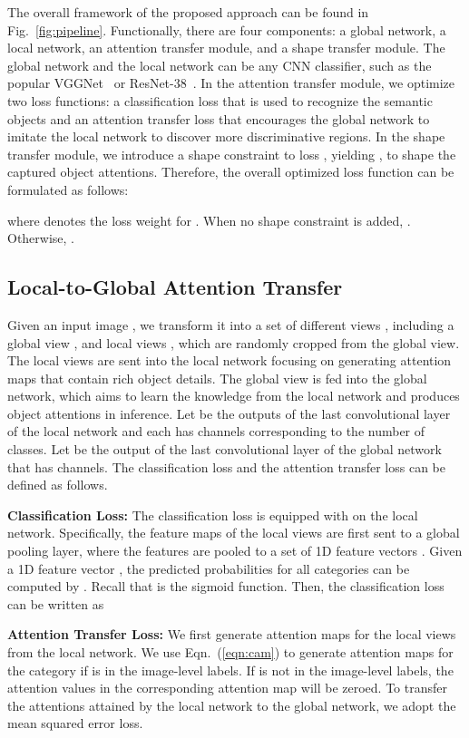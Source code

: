 \documentclass[10pt,twocolumn,letterpaper]{article}
\newcommand{\myPara}[1]{\vspace{.05in}\noindent\textbf{#1:}}
\newcommand{\figref}[1]{Fig.~\ref{#1}}
\newcommand{\eqnref}[1]{Eqn.~(\ref{#1})}
\begin{document}
The overall framework of the proposed approach can be found 
in \figref{fig:pipeline}.
Functionally, there are four components: a global network, a local
network, an attention transfer module, and a shape transfer module.
The global network and the local network can be any CNN classifier,
such as the popular VGGNet~\cite{simonyan2014very} 
or ResNet-38~\cite{wu2019wider}.
In the attention transfer module, we optimize two loss functions:
a classification loss  that is used to recognize the
semantic objects and an attention transfer loss 
that encourages the global network to imitate the local network
to discover more discriminative regions.
In the shape transfer module, we introduce a shape constraint to
loss , yielding ,
to shape the captured object attentions.
Therefore, the overall optimized loss function can be formulated as follows:

where  denotes the loss weight for .
When no shape constraint is added, .
Otherwise, .

\subsection{Local-to-Global Attention Transfer} \label{sec:ATr}


Given an input image , we transform it into a set of different views ,
including a global view , and  local views ,
which are randomly cropped from the global view.
The local views  are sent into the local network 
focusing on generating attention maps that contain rich object details.
The global view  is fed into the global network, which aims to
learn the knowledge from the local network and produces object attentions
in inference.
Let  be the outputs of the last convolutional layer 
of the local network and each has  channels
corresponding to the number of classes.
Let  be the output of the last convolutional layer of the global network 
that has  channels.
The classification loss and the attention transfer loss can be defined
as follows.


\myPara{Classification Loss}
The classification loss is equipped with on the local network.
Specifically, the feature maps  of the local views  
are first sent to a global pooling layer, 
where the features are pooled to a set of 1D feature vectors 
.
Given a 1D feature vector , 
the predicted probabilities for all categories can be 
computed by .
Recall that  is the sigmoid function.
Then, the classification loss  can be written as




\myPara{Attention Transfer Loss}
We first generate attention maps for the local views from the local network. 
We use \eqnref{eqn:cam} to generate attention maps 
 for the  category
if  is in the image-level labels.
If  is not in the image-level labels, the attention values in the
corresponding attention map will be zeroed. 
To transfer the attentions attained by the local network to 
the global network, we adopt the mean squared error loss.
\end{document}
